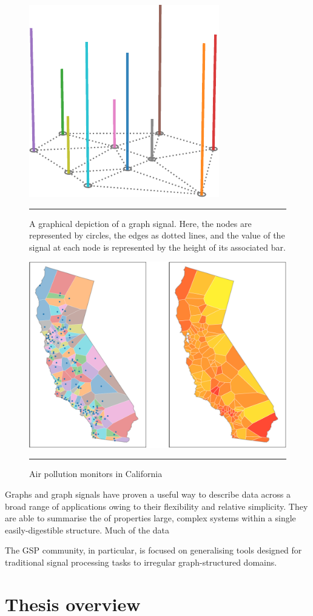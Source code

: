 \begin{figure}[htbp]
	\centering
		\includegraphics[width=0.4\linewidth]{Figures/graph_signal_cropped.pdf}
		\rule{35em}{0.5pt}
	\caption{A graphical depiction of a graph signal. Here, the nodes are represented by circles, the edges as dotted lines, and the value of the signal at each node is represented by the height of its associated bar. }
	\label{fig:graph_signal}
\end{figure}



\begin{figure}[htbp]
	\centering
		\includegraphics[width=0.95\linewidth]{Figures/cali_plot.pdf}
		\rule{35em}{0.5pt}
	\caption{Air pollution monitors in California }
	\label{fig:graph_signal}
\end{figure}


Graphs and graph signals have proven a useful way to describe data across a broad range of applications owing to their flexibility and relative simplicity. They are able to summarise the of properties large, complex systems within a single easily-digestible structure. Much of the data 


The GSP community, in particular, is focused on generalising tools designed for traditional signal processing tasks to irregular graph-structured domains. 

\citep{Ortega2018}



\section{Thesis overview}